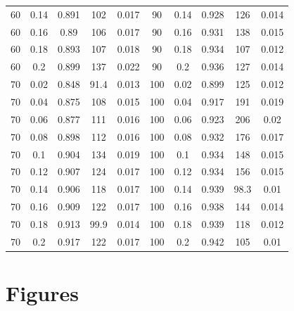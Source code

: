 \documentclass[12pt]{article}
\begin{document}
\begin{table}[ht!]
\begin{tabular}{c c | c | c c ||c c | c | c c |}
      60  & 0.14  & 0.891 & 102 & 0.017 & 90  & 0.14  & 0.928 & 126 & 0.014 \\
      60  & 0.16  & 0.89  & 106 & 0.017 & 90  & 0.16  & 0.931 & 138 & 0.015 \\
      60  & 0.18  & 0.893 & 107 & 0.018 & 90  & 0.18  & 0.934 & 107 & 0.012 \\
      60  & 0.2 & 0.899 & 137 & 0.022 & 90  & 0.2 & 0.936 & 127 & 0.014 \\
      70  & 0.02  & 0.848 & 91.4  & 0.013 & 100 & 0.02  & 0.899 & 125 & 0.012 \\
      70  & 0.04  & 0.875 & 108 & 0.015 & 100 & 0.04  & 0.917 & 191 & 0.019 \\
      70  & 0.06  & 0.877 & 111 & 0.016 & 100 & 0.06  & 0.923 & 206 & 0.02  \\
      70  & 0.08  & 0.898 & 112 & 0.016 & 100 & 0.08  & 0.932 & 176 & 0.017 \\
      70  & 0.1 & 0.904 & 134 & 0.019 & 100 & 0.1 & 0.934 & 148 & 0.015 \\
      70  & 0.12  & 0.907 & 124 & 0.017 & 100 & 0.12  & 0.934 & 156 & 0.015 \\
      70  & 0.14  & 0.906 & 118 & 0.017 & 100 & 0.14  & 0.939 & 98.3  & 0.01  \\
      70  & 0.16  & 0.909 & 122 & 0.017 & 100 & 0.16  & 0.938 & 144 & 0.014 \\
      70  & 0.18  & 0.913 & 99.9  & 0.014 & 100 & 0.18  & 0.939 & 118 & 0.012 \\
      70  & 0.2 & 0.917 & 122 & 0.017 & 100 & 0.2 & 0.942 & 105 & 0.01  \\
      \hline
    \end{tabular}
    \end{table}


\section{Figures}

\end{document}
